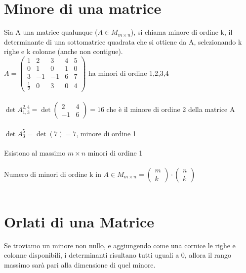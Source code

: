 \section{Minore di una matrice}
Sia A una matrice qualunque ($A\in M_{m\times n}$), si chiama minore
di ordine k, il determinante di una sottomatrice quadrata che si
ottiene da A, selezionando k righe e k colonne (anche non contigue).\\
$A=
\begin{pmatrix}
  1 & 2 & 3 & 4 & 5\\
  0 & 1 & 0 & 1 & 0\\
  3 & -1 & -1 & 6 & 7\\
  \frac{1}{2} & 0 & 3 & 0 & 4
\end{pmatrix}$ ha minori di ordine 1,2,3,4\leavevmode\\\\
$\det A^{2,4}_{1,3}=\det
\begin{pmatrix}
  2 & 4\\
  -1 & 6
\end{pmatrix}=16$ che è il minore di ordine 2 della matrice A\leavevmode\\\\
$\det A^{5}_{3}=\det(7)=7$, minore di ordine 1\leavevmode\\\\
Esistono al massimo $m\times n$ minori di ordine 1\leavevmode\\\\
Numero di minori di ordine k in $A\in M_{m\times n}=
\begin{pmatrix}
  m\\
  k
\end{pmatrix}\cdot
\begin{pmatrix}
  n\\
  k
\end{pmatrix}$
\leavevmode\\\\
\section{Orlati di una Matrice}

Se troviamo un minore non nullo, e aggiungendo come una cornice le
righe e colonne disponibili, i determinanti risultano tutti uguali a
0, allora il rango massimo sarà pari alla dimensione di quel minore.


